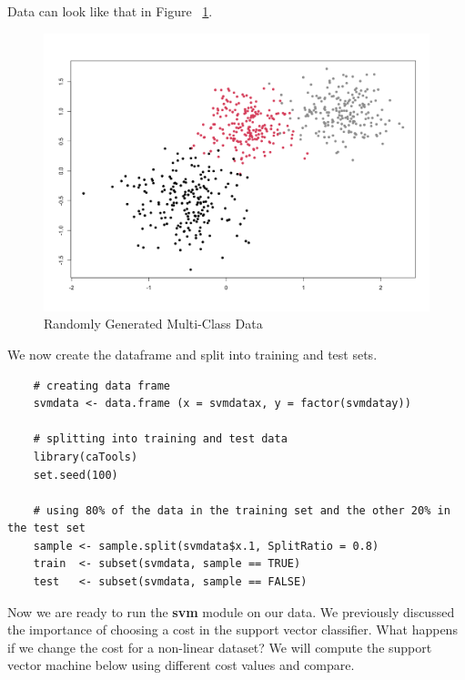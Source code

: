 \documentclass[12pt]{article}
\begin{document}
Data can look like that in Figure ~\ref{fig_svm_randomly_generated_data}.

\begin{figure}[ht]
    \centering
    \includegraphics[width=5in]{Figures/svm/svm_randomly_generated_data.png}
    \caption{Randomly Generated Multi-Class Data}
    \label{fig_svm_randomly_generated_data}
\end{figure}

We now create the dataframe and split into training and test sets.

\begin{verbatim}
    # creating data frame 
    svmdata <- data.frame (x = svmdatax, y = factor(svmdatay))
    
    # splitting into training and test data
    library(caTools)
    set.seed(100)
    
    # using 80% of the data in the training set and the other 20% in the test set
    sample <- sample.split(svmdata$x.1, SplitRatio = 0.8)
    train  <- subset(svmdata, sample == TRUE)
    test   <- subset(svmdata, sample == FALSE)    
\end{verbatim}

Now we are ready to run the \textbf{svm} module on our data. We previously discussed the importance of choosing a cost in the support vector classifier. What happens if we change the cost for a non-linear dataset? We will compute the support vector machine below using different cost values and compare.
\end{document}
